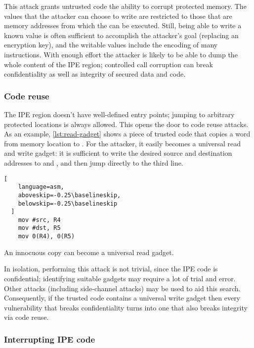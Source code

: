 This attack grants untrusted code the ability to corrupt protected memory. The values that the attacker can choose to write are restricted to those that are memory addresses from which the  can be executed. Still, being able to write a known value is often sufficient to accomplish the attacker's goal (\eg replacing an encryption key), and the writable values include the encoding of many instructions. With enough effort the attacker is likely to be able to dump the whole content of the IPE region; controlled call corruption can break confidentiality as well as integrity of secured data and code.

\subsubsection{Code reuse}
\label{sec:code-reuse}

The IPE region doesn't have well-defined entry points; jumping to arbitrary protected locations is always allowed. This opens the door to code reuse attacks. As an example, \cref{lst:read-gadget} shows a piece of trusted code that copies a word from memory location   to . For the attacker, it easily becomes a universal read and write gadget: it is sufficient to write the desired source and destination addresses to  and , and then jump directly to the third line.

\begin{listing}[htb]
  \begin{lstlisting}[
    language=asm,
    aboveskip=-0.25\baselineskip,
    belowskip=-0.25\baselineskip
  ]
    mov #src, R4
    mov #dst, R5
    mov 0(R4), 0(R5)
  \end{lstlisting}
  \caption{An innocuous copy can become a universal read gadget.}
  \label{lst:read-gadget}
\end{listing}


In isolation, performing this attack is not trivial, since the IPE code is confidential; identifying suitable gadgets may require a lot of trial and error. Other attacks (including side-channel attacks) may be used to aid this search. Consequently, if the trusted code contains a universal write gadget then every vulnerability that breaks confidentiality turns into one that also breaks integrity via code reuse.

\subsubsection{Interrupting IPE code}
\label{sec:interrupts}

